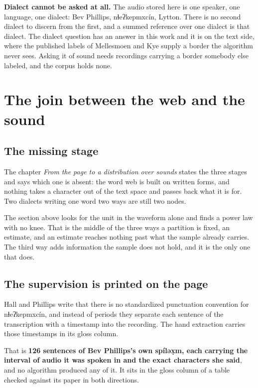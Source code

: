 \textbf{Dialect cannot be asked at all.} The audio stored here is one speaker, one language, one
dialect: Bev Phillips, nɬeʔkepmxcín, Lytton. There is no second dialect to discern from the first,
and a summed reference over one dialect is that dialect. The dialect question has an answer in this
work and it is on the text side, where the published labels of Mellesmoen and Kye
\cite{src:Mellesmoen-and-Kye-2026} supply a border the algorithm never sees. Asking it of sound needs
recordings carrying a border somebody else labeled, and the corpus holds none.

\section{The join between the web and the sound}

\subsection{The missing stage}

The chapter \emph{From the page to a distribution over sounds} states the three stages and says
which one is absent: the word web is built on written forms, and nothing takes a character out of the
text space and passes back what it is for. Two dialects writing one word two ways are still two
nodes.

The section above looks for the unit in the waveform alone and finds a power law with no knee. That
is the middle of the three ways a partition is fixed, an estimate, and an estimate reaches nothing
past what the sample already carries. The third way adds information the sample does not hold, and
it is the only one that does.

\subsection{The supervision is printed on the page}

Hall and Phillips \cite{src:Hall-and-Phillips-2025} write that there is no standardized punctuation
convention for nɬeʔkepmxcín, and instead of periods they separate each sentence of the transcription
with a timestamp into the recording. The hand extraction carries those timestamps in its gloss
column.

That is \textbf{126 sentences of Bev Phillips's own spíləx̣m, each carrying the interval of audio it
was spoken in and the exact characters she said}, and no algorithm produced any of it. It sits in the
gloss column of a table checked against its paper in both directions.

